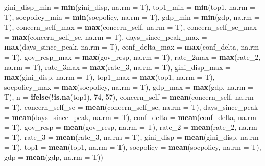 \documentclass[
]{article}
\newenvironment{Shaded}{\begin{snugshade}}{\end{snugshade}}
\newcommand{\DataTypeTok}[1]{\textcolor[rgb]{0.13,0.29,0.53}{#1}}
\newcommand{\DecValTok}[1]{\textcolor[rgb]{0.00,0.00,0.81}{#1}}
\newcommand{\KeywordTok}[1]{\textcolor[rgb]{0.13,0.29,0.53}{\textbf{#1}}}
\newcommand{\NormalTok}[1]{#1}
\newcommand{\OperatorTok}[1]{\textcolor[rgb]{0.81,0.36,0.00}{\textbf{#1}}}
\begin{document}
\begin{Shaded}
\begin{Highlighting}[]
{         \DataTypeTok{gini_disp_min =} \KeywordTok{min}\NormalTok{(gini_disp, }\DataTypeTok{na.rm =}\NormalTok{ T),}
         \DataTypeTok{top1_min =} \KeywordTok{min}\NormalTok{(top1, }\DataTypeTok{na.rm =}\NormalTok{ T),}
         \DataTypeTok{socpolicy_min =} \KeywordTok{min}\NormalTok{(socpolicy, }\DataTypeTok{na.rm =}\NormalTok{ T),}
         \DataTypeTok{gdp_min =} \KeywordTok{min}\NormalTok{(gdp, }\DataTypeTok{na.rm =}\NormalTok{ T),}
         \DataTypeTok{concern_self_max =} \KeywordTok{max}\NormalTok{(concern_self, }\DataTypeTok{na.rm =}\NormalTok{ T),}
         \DataTypeTok{concern_self_se_max =} \KeywordTok{max}\NormalTok{(concern_self_se, }\DataTypeTok{na.rm =}\NormalTok{ T),}
         \DataTypeTok{days_since_peak_max =} \KeywordTok{max}\NormalTok{(days_since_peak, }\DataTypeTok{na.rm =}\NormalTok{ T),}
         \DataTypeTok{conf_delta_max =} \KeywordTok{max}\NormalTok{(conf_delta, }\DataTypeTok{na.rm =}\NormalTok{ T),}
         \DataTypeTok{gov_resp_max =} \KeywordTok{max}\NormalTok{(gov_resp, }\DataTypeTok{na.rm =}\NormalTok{ T),}
         \DataTypeTok{rate_2max =} \KeywordTok{max}\NormalTok{(rate_}\DecValTok{2}\NormalTok{, }\DataTypeTok{na.rm =}\NormalTok{ T),}
         \DataTypeTok{rate_3max =} \KeywordTok{max}\NormalTok{(rate_}\DecValTok{3}\NormalTok{, }\DataTypeTok{na.rm =}\NormalTok{ T),}
         \DataTypeTok{gini_disp_max =} \KeywordTok{max}\NormalTok{(gini_disp, }\DataTypeTok{na.rm =}\NormalTok{ T),}
         \DataTypeTok{top1_max =} \KeywordTok{max}\NormalTok{(top1, }\DataTypeTok{na.rm =}\NormalTok{ T),}
         \DataTypeTok{socpolicy_max =} \KeywordTok{max}\NormalTok{(socpolicy, }\DataTypeTok{na.rm =}\NormalTok{ T),}
         \DataTypeTok{gdp_max =} \KeywordTok{max}\NormalTok{(gdp, }\DataTypeTok{na.rm =}\NormalTok{ T),}
         \DataTypeTok{n =} \KeywordTok{ifelse}\NormalTok{(}\OperatorTok{!}\KeywordTok{is.na}\NormalTok{(top1), }\DecValTok{74}\NormalTok{, }\DecValTok{57}\NormalTok{),}
         \DataTypeTok{concern_self =} \KeywordTok{mean}\NormalTok{(concern_self, }\DataTypeTok{na.rm =}\NormalTok{ T),}
         \DataTypeTok{concern_self_se =} \KeywordTok{mean}\NormalTok{(concern_self_se, }\DataTypeTok{na.rm =}\NormalTok{ T),}
         \DataTypeTok{days_since_peak =} \KeywordTok{mean}\NormalTok{(days_since_peak, }\DataTypeTok{na.rm =}\NormalTok{ T),}
         \DataTypeTok{conf_delta =} \KeywordTok{mean}\NormalTok{(conf_delta, }\DataTypeTok{na.rm =}\NormalTok{ T),}
         \DataTypeTok{gov_resp =} \KeywordTok{mean}\NormalTok{(gov_resp, }\DataTypeTok{na.rm =}\NormalTok{ T),}
         \DataTypeTok{rate_2 =} \KeywordTok{mean}\NormalTok{(rate_}\DecValTok{2}\NormalTok{, }\DataTypeTok{na.rm =}\NormalTok{ T),}
         \DataTypeTok{rate_3 =} \KeywordTok{mean}\NormalTok{(rate_}\DecValTok{3}\NormalTok{, }\DataTypeTok{na.rm =}\NormalTok{ T),}
         \DataTypeTok{gini_disp =} \KeywordTok{mean}\NormalTok{(gini_disp, }\DataTypeTok{na.rm =}\NormalTok{ T),}
         \DataTypeTok{top1 =} \KeywordTok{mean}\NormalTok{(top1, }\DataTypeTok{na.rm =}\NormalTok{ T),}
         \DataTypeTok{socpolicy =} \KeywordTok{mean}\NormalTok{(socpolicy, }\DataTypeTok{na.rm =}\NormalTok{ T),}
         \DataTypeTok{gdp =} \KeywordTok{mean}\NormalTok{(gdp, }\DataTypeTok{na.rm =}\NormalTok{ T))}

}
\end{Highlighting}
\end{Shaded}
\end{document}
